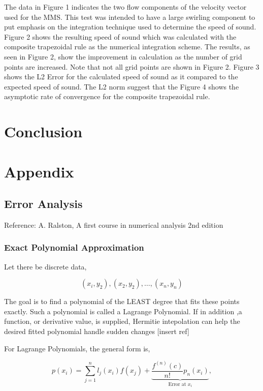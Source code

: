 \documentclass[12pt]{article}
\begin{document}
The data in Figure 1 indicates the two flow components of the velocity vector 
used for the MMS. This test was intended to have a large swirling component to
put emphasis on the integration technique used to determine the speed of sound.
Figure 2 shows the resulting speed of sound which was calculated
with the composite trapezoidal rule as the numerical integration scheme. The 
results, as seen in Figure 2, show the improvement in calculation as the number 
of grid points are increased. Note that not all grid points are shown in Figure 2. 
Figure 3 shows the L2 Error for the calculated speed of sound as it compared to the 
expected speed of sound. The L2 norm suggest that the  Figure 4 shows the asymptotic rate of convergence for
the composite trapezoidal rule.

\section{Conclusion}

\section{Appendix}

\subsection{Error Analysis}

Reference: A. Ralston, A first course in numerical analysis 2nd edition

\subsubsection{Exact Polynomial Approximation}

Let there be discrete data,

\begin{equation*}
    \left( x_{i},y_2 \right),\left( x_2, y_2 \right), \dots , \left( x_n,y_n \right)
\end{equation*}

The goal is to find a polynomial of the LEAST degree that fits these points
exactly.  Such a polynomial is called a Lagrange Polynomial. If in addition ,a
function, or derivative value, is supplied, Hermitie intepolation can help the 
desired fitted polynomial handle sudden changes [insert ref]

For Lagrange Polynomials, the general form is,

\begin{equation*}
    p\left( x_i  \right) =
    \sum_{j=1}^{n} l_j(x_i) f(x_j) + \underbrace{\frac{f^{(n)}\left( c \right)}
    {n!}p_n(x_i)}_{\text{Error at } x_i},
\end{equation*}
\end{document}
